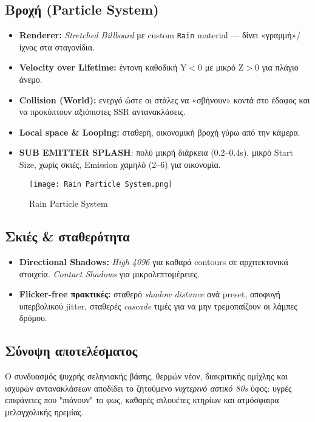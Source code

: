\subsection*{Βροχή (Particle System)}
\begin{itemize}
  \item \textbf{Renderer:} \emph{Stretched Billboard} με custom \texttt{Rain} material — δίνει «γραμμή»/ίχνος στα σταγονίδια.
  \item \textbf{Velocity over Lifetime:} έντονη καθοδική \(\mathrm{Y}<0\) με μικρό \(\mathrm{Z}>0\) για πλάγιο άνεμο.
  \item \textbf{Collision (World):} ενεργό ώστε οι στάλες να «σβήνουν» κοντά στο έδαφος και να προκύπτουν αξιόπιστες SSR αντανακλάσεις.
  \item \textbf{Local space \& Looping:} σταθερή, οικονομική βροχή γύρω από την κάμερα.
  \item \textbf{SUB EMITTER SPLASH}: πολύ μικρή διάρκεια (0.2–0.4s), μικρό Start Size, χωρίς σκιές, Emission χαμηλό (2–6) για οικονομία.
\end{itemize}
\begin{figure}[H]
    \centering
    \texttt{[image: Rain Particle System.png]}
    \caption{Rain Particle System}
    \label{fig:placeholder}
\end{figure}

\subsection*{Σκιές \& σταθερότητα}
\begin{itemize}
  \item \textbf{Directional Shadows:} \emph{High 4096} για καθαρά contours σε αρχιτεκτονικά στοιχεία. \textit{Contact Shadows} για μικρολεπτομέρειες.
  \item \textbf{Flicker-free πρακτικές:} σταθερό \emph{shadow distance} ανά preset, αποφυγή υπερβολικού jitter, σταθερές \emph{cascade} τιμές για να μην τρεμοπαίζουν οι λάμπες δρόμου.
\end{itemize}

\subsection*{Σύνοψη αποτελέσματος}
Ο συνδυασμός ψυχρής σεληνιακής βάσης, θερμών νέον, διακριτικής ομίχλης και ισχυρών αντανακλάσεων αποδίδει το ζητούμενο \textit{νυχτερινό αστικό 80s} ύφος: υγρές επιφάνειες που "πιάνουν" το φως, καθαρές σιλουέτες κτηρίων και ατμόσφαιρα μελαγχολικής ηρεμίας.

